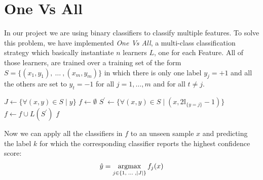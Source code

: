 \chapter{One Vs All}
In our project we are using binary classifiers to classify multiple features. To solve this problem, we have implemented \textit{One Vs All}, a multi-class classification strategy which basically instantiate $n$ learners $L$, one for each Feature. All of those learners, are trained over a training set of the form $S=\lbrace (x_{1},y_{1}),\:\dots\:,(x_{m},y_{m}) \rbrace$ in which there is only one label $y_{j}=+1$ and all the others are set to $y_{t}=-1$ for all $j = 1,\dots,m$ and for all $t \neq j$.



\begin{algorithm}[htpb]
	\caption{}
	\label{alg:dstumps}
	\begin{algorithmic}[1]
		\State $J \gets \lbrace \forall(x,y)\in S\; |\; y\rbrace$
		\State $f \gets \emptyset$
			\State $S^{\prime} \gets \lbrace \forall(x, y)\in S\; |\; (x, 2\mathbb{I}_{\lbrace y = j \rbrace} -1) \rbrace$
			\State $f \gets f \cup L(S^{\prime})$
		\EndFor
		\Return $f$
		\EndProcedure
	\end{algorithmic}
\end{algorithm}
Now we can apply all the classifiers in $f$ to an unseen sample $x$ and predicting the label $k$ for which the corresponding classifier reports the highest confidence score:
\begin{align*}
	\hat{y}=\operatorname*{argmax}_{j\in\lbrace 1,\;\dots\;, |J|\rbrace} f_{j}(x)
\end{align*} 

















